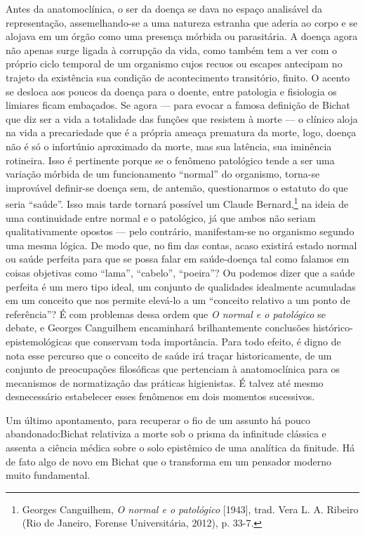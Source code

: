Antes da anatomoclínica, o ser da doença se dava no espaço analisável da
representação, assemelhando-se a uma natureza estranha que aderia ao
corpo e se alojava em um órgão como uma presença mórbida ou parasitária.
A doença agora não apenas surge ligada à corrupção da vida, como também
tem a ver com o próprio ciclo temporal de um organismo cujos recuos ou
escapes antecipam no trajeto da existência sua condição de acontecimento
transitório, finito. O acento se desloca aos poucos da doença para o
doente, entre patologia e fisiologia os limiares ficam embaçados. Se
agora --- para evocar a famosa definição de Bichat que diz ser a vida a
totalidade das funções que resistem à morte --- o clínico aloja na vida a
precariedade que é a própria ameaça prematura da morte, logo, doença não
é só o infortúnio aproximado da morte, mas sua latência, sua iminência
rotineira. Isso é pertinente porque se o fenômeno patológico tende a ser
uma variação mórbida de um funcionamento ``normal'' do organismo,
torna-se improvável definir-se doença sem, de antemão, questionarmos o
estatuto do que seria ``saúde''. Isso mais tarde tornará possível um
Claude Bernard,\footnote{Georges Canguilhem, \textit{O normal e o
  patológico} {[}1943{]}, trad. Vera L. A. Ribeiro (Rio de Janeiro,
  Forense Universitária, 2012), p. 33-7.} na ideia de uma continuidade
entre normal e o patológico, já que ambos não seriam qualitativamente
opostos --- pelo contrário, manifestam-se no organismo segundo uma mesma
lógica. De modo que, no fim das contas, acaso existirá estado normal ou
saúde perfeita para que se possa falar em saúde-doença tal como falamos
em coisas objetivas como ``lama'', ``cabelo'', ``poeira''? Ou podemos
dizer que a saúde perfeita é um mero tipo ideal, um conjunto de
qualidades idealmente acumuladas em um conceito que nos permite elevá-lo
a um ``conceito relativo a um ponto de referência''? É com problemas
dessa ordem que \textit{O normal e o patológico} se debate, e Georges
Canguilhem encaminhará brilhantemente conclusões
histórico-epistemológicas que conservam toda importância. Para todo
efeito, é digno de nota esse percurso que o conceito de saúde irá traçar
historicamente, de um conjunto de preocupações filosóficas que
pertenciam à anatomoclínica para os mecanismos de normatização das
práticas higienistas. É talvez até mesmo desnecessário estabelecer esses
fenômenos em dois momentos sucessivos.

Um último apontamento, para recuperar o fio de um assunto há pouco
abandonado:Bichat relativiza a morte sob o prisma da infinitude clássica
e assenta a ciência médica sobre o solo epistêmico de uma analítica da
finitude. Há de fato algo de novo em Bichat que o transforma em um
pensador moderno muito fundamental.

